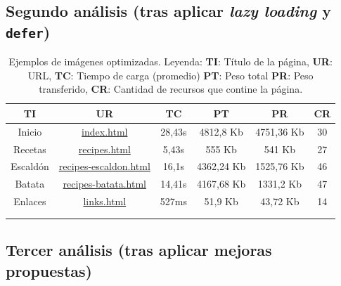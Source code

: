 \documentclass{article}
\begin{document}
\subsection{Segundo análisis (tras aplicar \textit{lazy loading} y \texttt{defer})}\label{sec:segundo-analisis}

\begin{longtable}{c|c|c|c|c|c}
    \hline
    \textbf{TI} & \textbf{UR} & \textbf{TC} & \textbf{PT} & \textbf{PR} & \textbf{CR} \\
    \endhead
    \hline
    Inicio & \href{https://www.danielramos.me/hhyc-dramosac/index.html}{index.html} & 28,43s & 4812,8 Kb & 4751,36 Kb & 30 \\
    Recetas & \href{https://www.danielramos.me/hhyc-dramosac/recipes.html}{recipes.html} & 5,43s & 555 Kb & 541 Kb & 27 \\
    Escaldón & \href{https://www.danielramos.me/hhyc-dramosac/recipes-escaldon.html}{recipes-escaldon.html} & 16,1s & 4362,24 Kb & 1525,76 Kb & 46 \\
    Batata & \href{https://www.danielramos.me/hhyc-dramosac/recipes-batata.html}{recipes-batata.html} & 14,41s & 4167,68 Kb & 1331,2 Kb & 47 \\
    Enlaces & \href{https://www.danielramos.me/hhyc-dramosac/links.html}{links.html} & 527ms & 51,9 Kb & 43,72 Kb & 14 \\
    \hline
     \\[1.5ex]
     \caption{
          Ejemplos de imágenes optimizadas.
          Leyenda: 
          \textbf{TI}: Título de la página, 
          \textbf{UR}: URL, 
          \textbf{TC}: Tiempo de carga (promedio) 
          \textbf{PT}: Peso total 
          \textbf{PR}: Peso transferido, 
          \textbf{CR}: Cantidad de recursos que contine la página.
     }
    \label{tab:imagenes-optimizadas}
\end{longtable}

\subsection{Tercer análisis (tras aplicar mejoras propuestas)}\label{sec:tercer-analisis}
\end{document}
